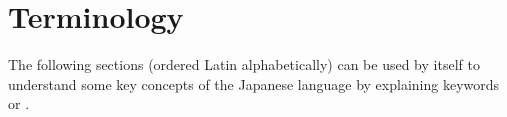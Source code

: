 \chapter{Terminology}
\label{chap:Terminology}
\label{sec:Terminology}

The following sections (ordered Latin alphabetically) can be used by itself to
understand some key concepts of the Japanese language by explaining keywords
or .

\begingroup
\setlength{\cftbeforejtermtitleskip}{-2em}
\listofjterminology
\endgroup


